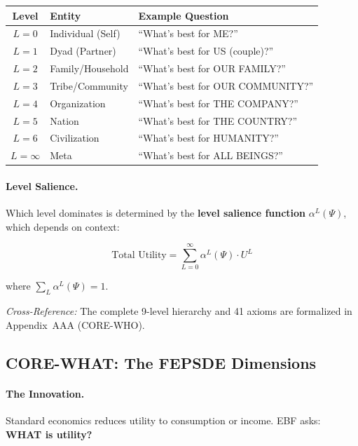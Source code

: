 \begin{center}
\renewcommand{\arraystretch}{1.2}
\begin{tabular}{@{}cll@{}}
\toprule
\textbf{Level} & \textbf{Entity} & \textbf{Example Question} \\
\midrule
$L = 0$ & Individual (Self) & ``What's best for ME?'' \\
$L = 1$ & Dyad (Partner) & ``What's best for US (couple)?'' \\
$L = 2$ & Family/Household & ``What's best for OUR FAMILY?'' \\
$L = 3$ & Tribe/Community & ``What's best for OUR COMMUNITY?'' \\
$L = 4$ & Organization & ``What's best for THE COMPANY?'' \\
$L = 5$ & Nation & ``What's best for THE COUNTRY?'' \\
$L = 6$ & Civilization & ``What's best for HUMANITY?'' \\
$L = \infty$ & Meta & ``What's best for ALL BEINGS?'' \\
\bottomrule
\end{tabular}
\end{center}

\paragraph{Level Salience.}
Which level dominates is determined by the \textbf{level salience function}
$\alpha^L(\Psi)$, which depends on context:

\begin{equation}
\text{Total Utility} = \sum_{L=0}^{\infty} \alpha^L(\Psi) \cdot U^L
\end{equation}

where $\sum_L \alpha^L(\Psi) = 1$.

\textit{Cross-Reference:} The complete 9-level hierarchy and 41 axioms are
formalized in Appendix~AAA (CORE-WHO).

\subsection{CORE-WHAT: The FEPSDE Dimensions}
\label{sec:8c-what}

\paragraph{The Innovation.}
Standard economics reduces utility to consumption or income. EBF asks:
\textbf{WHAT is utility?}

